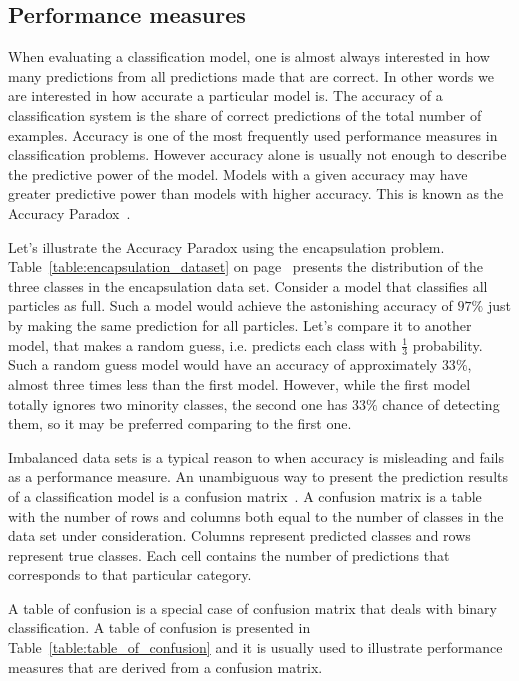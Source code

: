 \documentclass[a4paper, 11pt, table]{article}
\begin{document}
\subsection{Performance measures}

When evaluating a classification model, one is almost always interested in how many predictions from all predictions made that are correct. In other words we are interested in how accurate a particular model is. The accuracy of a classification system is the share of correct predictions of the total number of examples. Accuracy  is one of the most frequently used performance measures in classification problems. However accuracy alone is usually not enough to describe the predictive power of the model. Models with a given accuracy may have greater predictive power than models with higher accuracy. This is known as the Accuracy Paradox~\cite{zhu2007knowledge}.

Let's illustrate the Accuracy Paradox using the encapsulation problem. Table~\ref{table:encapsulation_dataset} on page~\pageref{table:encapsulation_dataset} presents the distribution of the three classes in the encapsulation data set. Consider a model that classifies all particles as full. Such a model would achieve the astonishing accuracy of $97\%$ just by making the same prediction for all particles. Let's compare it to another model, that makes a random guess, i.e. predicts each class with $\frac{1}{3}$ probability. Such a random guess model would have an accuracy of approximately $33\%$, almost three times less than the first model. However, while the first model totally ignores two minority classes, the second one has $33\%$ chance of detecting them, so it may be preferred comparing to the first one. 

Imbalanced data sets is a typical reason to when accuracy is misleading and fails as a performance measure. An unambiguous way to present the prediction results of a classification model is a confusion matrix~\cite{STEHMAN199777}. A confusion matrix is a table with the number of rows and columns both equal to the number of classes in the data set under consideration. Columns represent predicted classes and rows represent true classes. Each cell contains the number of predictions that corresponds to that particular category. 

A table of confusion is a special case of confusion matrix that deals with binary classification. A table of confusion is presented in Table~\ref{table:table_of_confusion} and it is usually used to illustrate performance measures that are derived from a confusion matrix.
\end{document}
